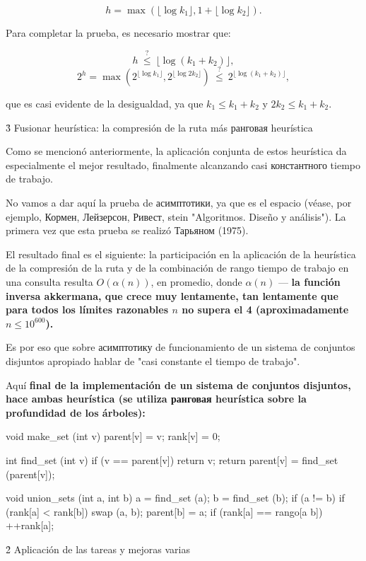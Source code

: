 $$ h = \max ( \lfloor \log k_1 \rfloor, 1 + \lfloor \log k_2 \rfloor ). $$

Para completar la prueba, es necesario mostrar que:

$$ h ~ \stackrel{?}{\le} ~ \lfloor \log (k_1+k_2) \rfloor, $$
$$ 2^h = \max ( 2 ^ {\lfloor \log k_1 \rfloor}, 2 ^ {\lfloor \log 2 k_2 \rfloor} ) ~ \stackrel{?}{\le} ~ 2 ^ {\lfloor \log (k_1+k_2) \rfloor}, $$

que es casi evidente de la desigualdad, ya que $k_1 \le k_1+k_2$ y $2 k_2 \le k_1+k_2$.



\h3{ Fusionar heurística: la compresión de la ruta más ранговая heurística }

Como se mencionó anteriormente, la aplicación conjunta de estos heurística da especialmente el mejor resultado, finalmente alcanzando casi константного tiempo de trabajo.

No vamos a dar aquí la prueba de асимптотики, ya que es el espacio (véase, por ejemplo, Кормен, Лейзерсон, Ривест, stein "Algoritmos. Diseño y análisis"). La primera vez que esta prueba se realizó Тарьяном (1975).

El resultado final es el siguiente: la participación en la aplicación de la heurística de la compresión de la ruta y de la combinación de rango tiempo de trabajo en una consulta resulta $O (\alpha(n))$, en promedio, donde $\alpha(n)$ --- \bf{la función inversa akkermana}, que crece muy lentamente, tan lentamente que para todos los límites razonables $n$ \bf{no supera el 4} (aproximadamente $n \le 10^{600}$).

Es por eso que sobre асимптотику de funcionamiento de un sistema de conjuntos disjuntos apropiado hablar de "casi constante el tiempo de trabajo".

Aquí \bf{final de la implementación de un sistema de conjuntos disjuntos}, hace ambas heurística (se utiliza ранговая heurística sobre la profundidad de los árboles):

\code
void make_set (int v) {
parent[v] = v;
rank[v] = 0;
}

int find_set (int v) {
if (v == parent[v])
return v;
return parent[v] = find_set (parent[v]);
}

void union_sets (int a, int b) {
a = find_set (a);
b = find_set (b);
if (a != b) {
if (rank[a] < rank[b])
swap (a, b);
parent[b] = a;
if (rank[a] == rango[a b])
++rank[a];
}
}
\endcode




\h2{ Aplicación de las tareas y mejoras varias }

